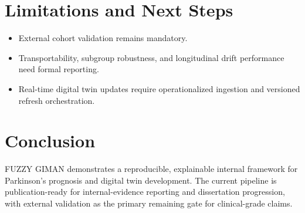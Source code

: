 \documentclass[conference]{IEEEtran}
\begin{document}
\section{Limitations and Next Steps}
\begin{itemize}
\item External cohort validation remains mandatory.
\item Transportability, subgroup robustness, and longitudinal drift performance need formal reporting.
\item Real-time digital twin updates require operationalized ingestion and versioned refresh orchestration.
\end{itemize}

\section{Conclusion}
FUZZY GIMAN demonstrates a reproducible, explainable internal framework for Parkinson's prognosis and digital twin development. The current pipeline is publication-ready for internal-evidence reporting and dissertation progression, with external validation as the primary remaining gate for clinical-grade claims.
\end{document}
